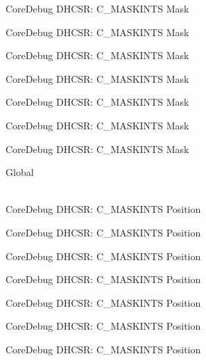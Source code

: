 \begin{DoxyRefList}
\label{deprecated__deprecated000122}%
%
Core\+Debug DHCSR\+: C\+\_\+\+MASKINTS Mask 

\label{deprecated__deprecated000178}%
%
Core\+Debug DHCSR\+: C\+\_\+\+MASKINTS Mask 

\label{deprecated__deprecated000261}%
%
Core\+Debug DHCSR\+: C\+\_\+\+MASKINTS Mask 

\label{deprecated__deprecated000320}%
%
Core\+Debug DHCSR\+: C\+\_\+\+MASKINTS Mask 

\label{deprecated__deprecated000396}%
%
Core\+Debug DHCSR\+: C\+\_\+\+MASKINTS Mask 

\label{deprecated__deprecated000485}%
%
Core\+Debug DHCSR\+: C\+\_\+\+MASKINTS Mask 

\label{deprecated__deprecated000587}%
%
Core\+Debug DHCSR\+: C\+\_\+\+MASKINTS Mask  
\item[{\parbox[t]{\linewidth}{Global \doxylink{group___c_m_s_i_s___core_debug_ga0d2907400eb948a4ea3886ca083ec8e3}{Core\+Debug\+\_\+\+DHCSR\+\_\+\+C\+\_\+\+MASKINTS\+\_\+\+Pos} }}]\hfill \\
\label{deprecated__deprecated000033}%
%
Core\+Debug DHCSR\+: C\+\_\+\+MASKINTS Position 

\label{deprecated__deprecated000121}%
%
Core\+Debug DHCSR\+: C\+\_\+\+MASKINTS Position 

\label{deprecated__deprecated000177}%
%
Core\+Debug DHCSR\+: C\+\_\+\+MASKINTS Position 

\label{deprecated__deprecated000260}%
%
Core\+Debug DHCSR\+: C\+\_\+\+MASKINTS Position 

\label{deprecated__deprecated000319}%
%
Core\+Debug DHCSR\+: C\+\_\+\+MASKINTS Position 

\label{deprecated__deprecated000395}%
%
Core\+Debug DHCSR\+: C\+\_\+\+MASKINTS Position 

\label{deprecated__deprecated000484}%
%
Core\+Debug DHCSR\+: C\+\_\+\+MASKINTS Position 


\end{DoxyRefList}
